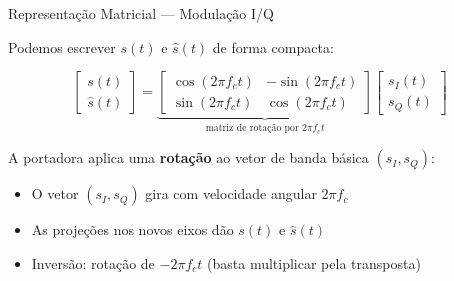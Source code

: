 \begin{frame}{Representação Matricial — Modulação I/Q}

Podemos escrever $s(t)$ e $\hat{s}(t)$ de forma compacta:

\[
\boxed{
\begin{bmatrix} s(t) \\ \hat{s}(t) \end{bmatrix}
=
\underbrace{
\begin{bmatrix}
\cos(2\pi f_c t) & -\sin(2\pi f_c t) \\
\sin(2\pi f_c t) & \cos(2\pi f_c t)
\end{bmatrix}
}_{\text{matriz de rotação por } 2\pi f_c t}
\begin{bmatrix} s_I(t) \\ s_Q(t) \end{bmatrix}
}
\]

\vspace{3mm}

A portadora aplica uma \textbf{rotação} ao vetor de banda básica $(s_I, s_Q)$:
\begin{itemize}
\item O vetor $(s_I, s_Q)$ gira com velocidade angular $2\pi f_c$
\item As projeções nos novos eixos dão $s(t)$ e $\hat{s}(t)$
\item Inversão: rotação de $-2\pi f_c t$ (basta multiplicar pela transposta)
\end{itemize}

\end{frame}


